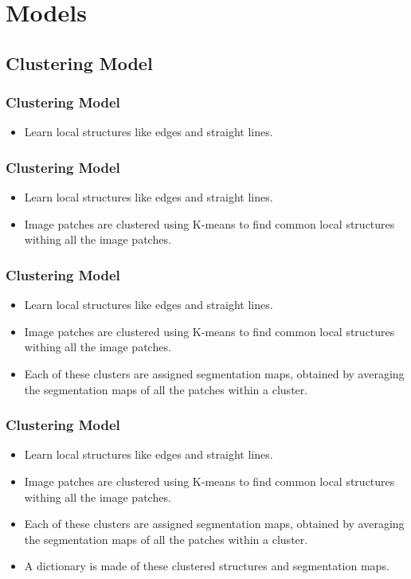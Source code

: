 \documentclass{beamer}
\begin{document}
	\section{Models}
	\subsection{Clustering Model}
	\begin{frame}[t]
		\frametitle{Clustering Model}
		\begin{itemize}
			\item Learn local structures like edges and straight lines.
	
		\end{itemize}
	\end{frame}
	\begin{frame}[t]
		\frametitle{Clustering Model}
		\begin{itemize}
			\item Learn local structures like edges and straight lines.
			\item Image patches are clustered using K-means to find common local structures withing all the image patches.

		\end{itemize}
	\end{frame}	
	\begin{frame}[t]
		\frametitle{Clustering Model}
		\begin{itemize}
			\item Learn local structures like edges and straight lines.
			\item Image patches are clustered using K-means to find common local structures withing all the image patches.
			\item Each of these clusters are assigned segmentation maps, obtained by averaging the segmentation maps of all the patches within a cluster.

		\end{itemize}
	\end{frame}	
	\begin{frame}[t]
		\frametitle{Clustering Model}
		\begin{itemize}
			\item Learn local structures like edges and straight lines.
			\item Image patches are clustered using K-means to find common local structures withing all the image patches.
			\item Each of these clusters are assigned segmentation maps, obtained by averaging the segmentation maps of all the patches within a cluster.
			\item A dictionary is made of these clustered structures and segmentation maps.
		\end{itemize}
	\end{frame}	
	
\end{document}
